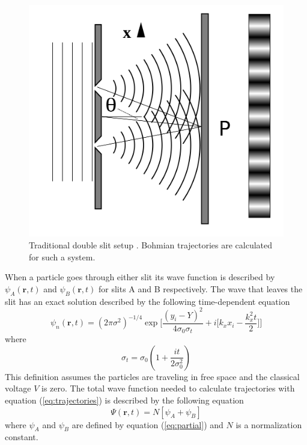 \documentclass[10pt, reqno]{article}
\begin{document}
  \begin{figure}[!ht]
    \centerline{\includegraphics[scale=.2]{./imgs/double-slit.png}}
    \caption{
      Traditional double slit setup \cite{wiki}. 
      Bohmian trajectories are calculated for such a system.
    }
    \label{fig:double-slit}
  \end{figure}

  When a particle goes through either slit its wave function is described by $\psi_A(\mathbf{r},t)$ and $\psi_B(\mathbf{r},t)$ for slits A and B respectively.
  The wave that leaves the slit has an exact solution described by the following time-dependent equation \cite{guay-double-slit}
  \begin{equation}
    \label{eq:partial}
    \psi_n(\mathbf{r},t) = (2\pi\sigma^2)^{-1/4} \exp \Bigg[ \frac{(y_i - Y)^2}{4 \sigma_{0} \sigma_{t}} + i \Bigg[ k_x x_i - \frac{k_x^2 t}{2} \Bigg]\Bigg]
  \end{equation}
  where 
  \begin{equation}
    \sigma_{t} = \sigma_{0}(1 + \frac{it}{2\sigma^2_0})
  \end{equation}
  This definition assumes the particles are traveling in free space and the classical voltage $V$ is zero.
  The total wave function needed to calculate trajectories with equation (\ref{eq:trajectories}) is described by the following equation
  \begin{equation}
    \label{eq:total-wave-function}
    \Psi(\mathbf{r},t) = N [\psi_A + \psi_B ]
  \end{equation}
  where $\psi_A$ and $\psi_B$ are defined by equation (\ref{eq:partial}) and $N$ is a normalization constant.
\end{document}
